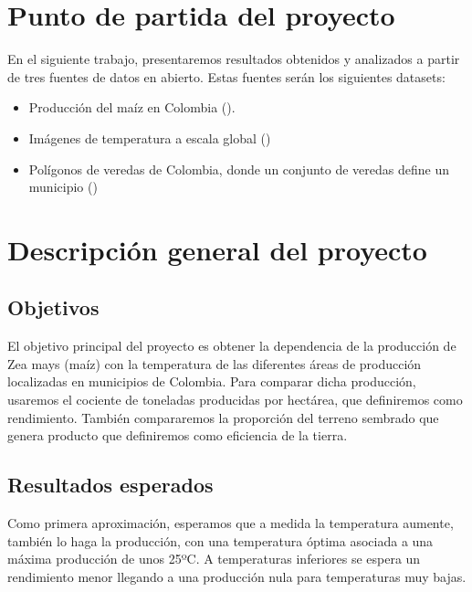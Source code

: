\documentclass[12pt, spanish]{article}
\begin{document}
\setlength{\parskip}{1em} %
\tableofcontents 
\listoftables
\listoffigures
\newpage
{}
\setcounter{page}{1}

\section{Punto de partida del proyecto}

En el siguiente trabajo, presentaremos resultados obtenidos y analizados a partir de tres fuentes de datos en abierto. Estas fuentes serán los siguientes datasets:

\begin{itemize}
    \item Producción del maíz en Colombia (\cite{GobiernodeColombia2018}).
    
    \item Imágenes de temperatura a escala global (\cite{NASALPDAACattheUSGSEROSCenter2019})
    
    \item Polígonos de veredas de Colombia, donde un conjunto de veredas define un municipio (\cite{DANECOL2017})
\end{itemize}


\section{Descripción general del proyecto}

\subsection{Objetivos}

El objetivo principal del proyecto es obtener la dependencia de la producción de Zea mays (maíz) con la temperatura de las diferentes áreas de producción localizadas en municipios de Colombia. Para comparar dicha producción, usaremos el cociente de toneladas producidas por hectárea, que definiremos como rendimiento. También compararemos la proporción del terreno sembrado que genera producto que definiremos como eficiencia de la tierra.


\subsection{Resultados esperados}
Como primera aproximación, esperamos que a medida la temperatura aumente, también lo haga la producción, con una temperatura óptima asociada a una máxima producción de unos 25ºC. A temperaturas inferiores se espera un rendimiento menor llegando a una producción nula para temperaturas muy bajas.
\end{document}
